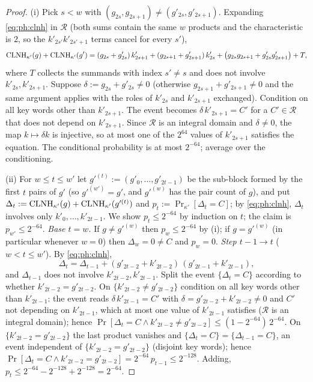 \begin{proof}
(i) Pick $s<w$ with $(g_{2s},g_{2s+1})\ne(g'_{2s},g'_{2s+1})$.  Expanding
\eqref{eq:ph:clnh} in $\mathcal R$ (both sums contain the same $w$ products
and the characteristic is $2$, so the $k'_{2s'}k'_{2s'+1}$ terms cancel for
every $s'$),
\[
  \mathrm{CLNH}_{\kappa'}(g)+\mathrm{CLNH}_{\kappa'}(g')
  =(g_{2s}+g'_{2s})\,k'_{2s+1}+(g_{2s+1}+g'_{2s+1})\,k'_{2s}
   +\bigl(g_{2s}g_{2s+1}+g'_{2s}g'_{2s+1}\bigr)+T,
\]
where $T$ collects the summands with index $s'\ne s$ and does not involve
$k'_{2s},k'_{2s+1}$.  Suppose $\delta:=g_{2s}+g'_{2s}\ne0$ (otherwise
$g_{2s+1}+g'_{2s+1}\ne0$ and the same argument applies with the roles of
$k'_{2s}$ and $k'_{2s+1}$ exchanged).  Condition on all key words other than
$k'_{2s+1}$.  The event becomes $\delta\,k'_{2s+1}=C'$ for a $C'\in\mathcal R$
that does not depend on $k'_{2s+1}$.  Since $\mathcal R$ is an integral domain
and $\delta\ne0$, the map $k\mapsto\delta k$ is injective, so at most one of
the $2^{64}$ values of $k'_{2s+1}$ satisfies the equation.  The conditional
probability is at most $2^{-64}$; average over the conditioning.

(ii) For $w\le t\le w'$ let $g'^{(t)}:=(g'_0,\dots,g'_{2t-1})$ be the sub-block
formed by the first $t$ pairs of $g'$ (so $g'^{(w')}=g'$, and $g'^{(w)}$ has the
pair count of $g$), and put
$\Delta_t:=\mathrm{CLNH}_{\kappa'}(g)+\mathrm{CLNH}_{\kappa'}(g'^{(t)})$ and $p_t:=\Pr_{\kappa'}[\Delta_t=C]$;
by \eqref{eq:ph:clnh}, $\Delta_t$ involves only $k'_0,\dots,k'_{2t-1}$.  We show
$p_t\le2^{-64}$ by induction on $t$; the claim is $p_{w'}\le2^{-64}$.
\emph{Base $t=w$.}  If $g\ne g'^{(w)}$ then $p_w\le2^{-64}$ by (i); if
$g=g'^{(w)}$ (in particular whenever $w=0$) then $\Delta_w=0\ne C$ and $p_w=0$.
\emph{Step $t-1\to t$} ($w<t\le w'$).  By \eqref{eq:ph:clnh},
\[
  \Delta_t=\Delta_{t-1}+(g'_{2t-2}+k'_{2t-2})\,(g'_{2t-1}+k'_{2t-1}),
\]
and $\Delta_{t-1}$ does not involve $k'_{2t-2},k'_{2t-1}$.  Split the event
$\{\Delta_t=C\}$ according to whether $k'_{2t-2}=g'_{2t-2}$.
On $\{k'_{2t-2}\ne g'_{2t-2}\}$ condition on all key words other than $k'_{2t-1}$:
the event reads $\delta\,k'_{2t-1}=C'$ with $\delta=g'_{2t-2}+k'_{2t-2}\ne0$ and
$C'$ not depending on $k'_{2t-1}$, which at most one value of $k'_{2t-1}$
satisfies ($\mathcal R$ is an integral domain); hence
$\Pr[\Delta_t=C\wedge k'_{2t-2}\ne g'_{2t-2}]\le(1-2^{-64})\,2^{-64}$.
On $\{k'_{2t-2}=g'_{2t-2}\}$ the last product vanishes and
$\{\Delta_t=C\}=\{\Delta_{t-1}=C\}$, an event independent of
$\{k'_{2t-2}=g'_{2t-2}\}$ (disjoint key words); hence
$\Pr[\Delta_t=C\wedge k'_{2t-2}=g'_{2t-2}]=2^{-64}\,p_{t-1}\le2^{-128}$.
Adding, $p_t\le2^{-64}-2^{-128}+2^{-128}=2^{-64}$.
\end{proof}

